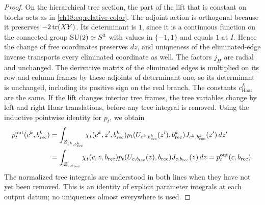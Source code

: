 \begin{proof}
On the hierarchical tree section, the part of the lift that is constant on blocks acts as in \eqref{ch18:eq:relative-color}. The adjoint action is orthogonal because it preserves $-2\operatorname{tr}(XY)$. Its determinant is $1$, since it is a continuous function on the connected group $\mathrm{SU}(2)\simeq S^3$ with values in $\{-1,1\}$ and equals $1$ at $I$. Hence the change of free coordinates preserves $dz$, and uniqueness of the eliminated-edge inverse transports every eliminated coordinate as well. The factors $j_H$ are radial and unchanged. The derivative matrix of the eliminated edges is multiplied on its row and column frames by these adjoints of determinant one, so its determinant is unchanged, including its positive sign on the real branch. The constants $c_{\mathrm{Haar}}^{f_i}$ are the same. If the lift changes interior tree frames, the tree variables change by left and right Haar translations, before any tree integral is removed. Using the inductive pointwise identity for $p_t$, we obtain
\begin{equation}\label{ch18:eq:pointwise-raw-covariance}
 \begin{split}
 p_t^{\mathrm{out}}(c^k,b_{\mathrm{rec}}^k)
 &=\int_{Z_{c^k,b_{\mathrm{rec}}^k}}
       \chi_t(c^k,z',b_{\mathrm{rec}}^k)
       p_t(U_{c^k,b_{\mathrm{rec}}^k}(z'),b_{\mathrm{rec}}^k)
                         J_{c^k,b_{\mathrm{rec}}^k}(z')\,dz'\\
 &=\int_{Z_{c,b_{\mathrm{rec}}}}
       \chi_t(c,z,b_{\mathrm{rec}})
       p_t(U_{c,b_{\mathrm{rec}}}(z),b_{\mathrm{rec}})J_{c,b_{\mathrm{rec}}}(z)\,dz
 =p_t^{\mathrm{out}}(c,b_{\mathrm{rec}}).
 \end{split}
\end{equation}
The normalized tree integrals are understood in both lines when they have not yet been removed. This is an identity of explicit parameter integrals at each output datum; no uniqueness almost everywhere is used.


\end{proof}
